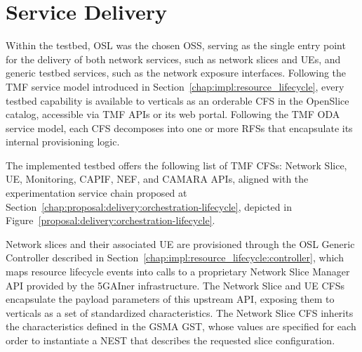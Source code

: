 \section{Service Delivery}
\label{chap:impl:delivery}

Within the testbed, \acs{OSL} was the chosen \acs{OSS}, serving as the single entry point for the delivery of both network services, such as network slices and \acsp{UE}, and generic testbed services, such as the network exposure interfaces. Following the \acs{TMF} service model introduced in Section~\ref{chap:impl:resource_lifecycle}, every testbed capability is available to verticals as an orderable \acs{CFS} in the OpenSlice catalog, accessible via \acs{TMF} \acsp{API} or its web portal. Following the \acs{TMF} \acs{ODA} service model, each \acs{CFS} decomposes into one or more \acsp{RFS} that encapsulate its internal provisioning logic.

The implemented testbed offers the following list of \acs{TMF} \acsp{CFS}: Network Slice, \acs{UE}, Monitoring, \acs{CAPIF}, \acs{NEF}, and CAMARA \acsp{API}, aligned with the experimentation service chain proposed at Section~\ref{chap:proposal:delivery:orchestration-lifecycle}, depicted in Figure~\ref{proposal:delivery:orchestration-lifecycle}.

Network slices and their associated \acs{UE} are provisioned through the \acs{OSL} Generic Controller described in Section~\ref{chap:impl:resource_lifecycle:controller}, which maps resource lifecycle events into calls to a proprietary Network Slice Manager \acs{API} provided by the 5GAIner infrastructure. The Network Slice and \acs{UE} \acsp{CFS} encapsulate the payload parameters of this upstream \acs{API}, exposing them to verticals as a set of standardized characteristics. The Network Slice \acs{CFS} inherits the characteristics defined in the \acs{GSMA} \acs{GST}, whose values are specified for each order to instantiate a \acs{NEST} that describes the requested slice configuration.


